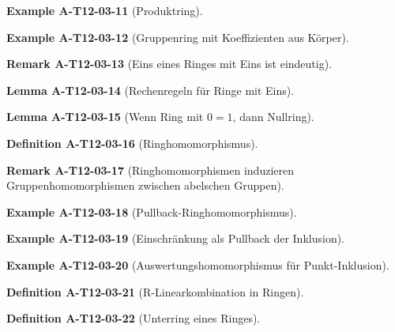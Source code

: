 \documentclass[10pt, letterpaper]{article}
\newcommand{\CustomHeading}[3]{%
  \par\medskip\noindent%
  \textbf{#1 #2} \textnormal{(#3)}.\enskip%
}
\newenvironment{DEF}[2]{\CustomHeading{Definition}{#1}{#2}}{}
\newenvironment{LEM}[2]{\CustomHeading{Lemma}{#1}{#2}}{}
\newenvironment{REM}[2]{\CustomHeading{Remark}{#1}{#2}}{}
\newenvironment{EXA}[2]{\CustomHeading{Example}{#1}{#2}}{}
\begin{document}
\begin{EXA}{A-T12-03-11}{Produktring}
\end{EXA}

\begin{EXA}{A-T12-03-12}{Gruppenring mit Koeffizienten aus Körper}
\end{EXA}

\begin{REM}{A-T12-03-13}{Eins eines Ringes mit Eins ist eindeutig}
\end{REM}

\begin{LEM}{A-T12-03-14}{Rechenregeln für Ringe mit Eins}
\end{LEM}

\begin{LEM}{A-T12-03-15}{Wenn Ring mit $0=1$, dann Nullring}
\end{LEM}

\begin{DEF}{A-T12-03-16}{Ringhomomorphismus}
\end{DEF}

\begin{REM}{A-T12-03-17}{Ringhomomorphismen induzieren Gruppenhomomorphismen zwischen abelschen Gruppen}
\end{REM}

\begin{EXA}{A-T12-03-18}{Pullback-Ringhomomorphismus}
\end{EXA}

\begin{EXA}{A-T12-03-19}{Einschränkung als Pullback der Inklusion}
\end{EXA}

\begin{EXA}{A-T12-03-20}{Auswertungshomomorphismus für Punkt-Inklusion}
\end{EXA}

\begin{DEF}{A-T12-03-21}{R-Linearkombination in Ringen}
\end{DEF}

\begin{DEF}{A-T12-03-22}{Unterring eines Ringes}
\end{DEF}
\end{document}

